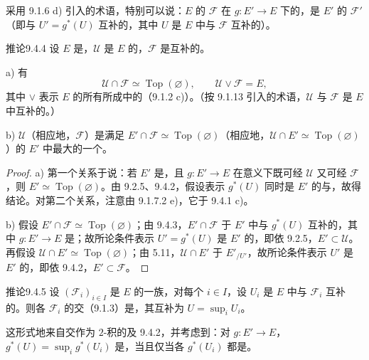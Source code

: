 采用 9.1.6 d) 引入的术语，特别可以说：$E$ 的 $\mathcal F$ 在 $g:E'\to E$ 下的，是 $E'$ 的 $\mathcal F'$（即与 $U'=g^*(U)$ 互补的，其中 $U$ 是 $E$ 中与 $\mathcal F$ 互补的）。
\begin{SGAresult}{推论}{9.4.4}
设 $E$ 是，$\mathcal U$ 是 $E$ 的，$\mathcal F$ 是互补的。

a) 有
\[
\mathcal U\cap\mathcal F\simeq\operatorname{Top}(\varnothing),\qquad
\mathcal U\vee\mathcal F=E,
\]
其中 $\vee$ 表示 $E$ 的所有所成中的（9.1.2 c)）。（按 9.1.13 引入的术语，$\mathcal U$ 与 $\mathcal F$ 是 $E$ 中互补的。）

b) $\mathcal U$（相应地，$\mathcal F$）是满足 $E'\cap\mathcal F\simeq\operatorname{Top}(\varnothing)$（相应地，$\mathcal U\cap E'\simeq\operatorname{Top}(\varnothing)$）的 $E'$ 中最大的一个。
\end{SGAresult}
\begin{proof}
a) 第一个关系于说：若 $E'$ 是，且 $g:E'\to E$ 在意义下既可经 $\mathcal U$ 又可经 $\mathcal F$ ，则 $E'\simeq\operatorname{Top}(\varnothing)$。由 9.2.5、9.4.2，假设表示 $g^*(U)$ 同时是 $E'$ 的与，故得结论。对第二个关系，注意由 9.1.7.2 e)，它于 9.4.1 c)。

b) 假设 $E'\cap\mathcal F\simeq\operatorname{Top}(\varnothing)$；由 9.4.3，$E'\cap\mathcal F$ 于 $E'$ 中与 $g^*(U)$ 互补的，其中 $g:E'\to E$ 是；故所论条件表示 $U'=g^*(U)$ 是 $E'$ 的，即依 9.2.5，$E'\subset\mathcal U$。再假设 $\mathcal U\cap E'\simeq\operatorname{Top}(\varnothing)$；由 5.11，$\mathcal U\cap E'$ 于 $E'_{/U'}$，故所论条件表示 $U'$ 是 $E'$ 的，即依 9.4.2，$E'\subset\mathcal F$。
\end{proof}
\begin{SGAresult}{推论}{9.4.5}
设 $(\mathcal F_i)_{i\in I}$ 是 $E$ 的一族，对每个 $i\in I$，设 $U_i$ 是 $E$ 中与 $\mathcal F_i$ 互补的。则各 $\mathcal F_i$ 的交（9.1.3）是，其互补为 $U=\sup_iU_i$。
\end{SGAresult}
这形式地来自交作为 $2$-积的及 9.4.2，并考虑到：对 $g:E'\to E$，$g^*(U)=\sup_i g^*(U_i)$ 是，当且仅当各 $g^*(U_i)$ 都是。

